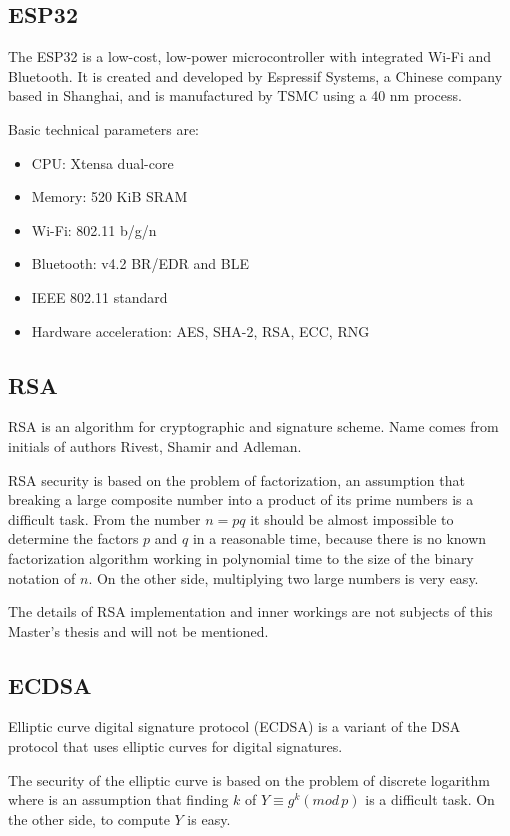 \documentclass[thesis=M,english]{FITthesis}[2019/12/23]
\begin{document}
\subsection{ESP32}
The ESP32 is a low-cost, low-power microcontroller with integrated Wi-Fi and Bluetooth. It is created and developed by Espressif Systems, a Chinese company based in Shanghai, and is manufactured by TSMC using a 40 nm process.

\bigskip
\noindent
Basic technical parameters are:
\begin{itemize}
\item	CPU: Xtensa dual-core
\item	Memory: 520 KiB SRAM
\item	Wi-Fi: 802.11 b/g/n
\item	Bluetooth: v4.2 BR/EDR and BLE
\item	IEEE 802.11 standard
\item	Hardware acceleration: AES, SHA-2, RSA, ECC, RNG
\end{itemize}

\subsection{RSA}
RSA is an algorithm for cryptographic and signature scheme. Name comes from initials of authors Rivest, Shamir and Adleman.

\bigskip
\noindent
RSA security is based on the problem of factorization, an assumption that breaking a large composite number into a product of its prime numbers is a difficult task. From the number $n = pq$ it should be almost impossible to determine the factors $p$ and $q$ in a reasonable time, because there is no known factorization algorithm working in polynomial time to the size of the binary notation of $n$. On the other side, multiplying two large numbers is very easy.

\bigskip
\noindent
The details of RSA implementation and inner workings are not subjects of this Master's thesis and will not be mentioned.

\subsection{ECDSA}
Elliptic curve digital signature protocol (ECDSA) is a variant of the DSA protocol that uses elliptic curves for digital signatures.

\bigskip
\noindent
The security of the elliptic curve is based on the problem of discrete logarithm where is an assumption that finding $k$ of $Y \equiv g^k (mod \, p)$ is a difficult task. On the other side, to compute $Y$ is easy.
\end{document}
